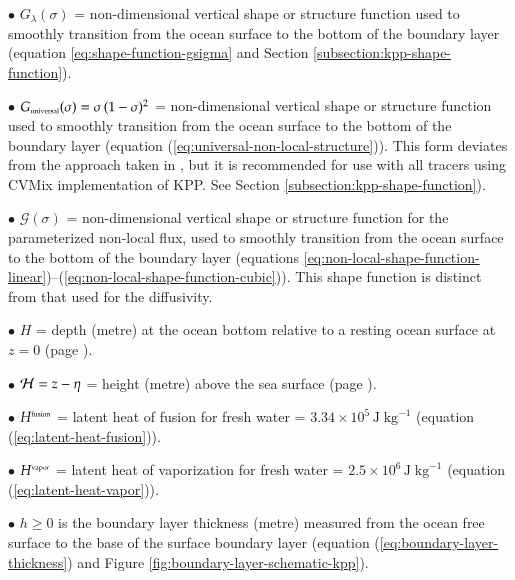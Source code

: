 \begin{trivlist}
 \item[$\bullet$] $G _{\lambda} (\sigma)$ = non-dimensional vertical
   shape or structure function used to smoothly transition from the
   ocean surface to the bottom of the boundary layer (equation
   \ref{eq:shape-function-gsigma} and Section
   \ref{subsection:kpp-shape-function}).

 \item[$\bullet$] $G _{\mbox{\tiny universal}}(\sigma) = \sigma \,
   (1-\sigma)^{2}$ = non-dimensional vertical shape or structure
   function used to smoothly transition from the ocean surface to the
   bottom of the boundary layer (equation
   (\ref{eq:universal-non-local-structure})).  This form deviates from
   the approach taken in \cite{LargeKPP}, but it is recommended for
   use with all tracers using CVMix implementation of KPP. See Section
   \ref{subsection:kpp-shape-function}).

 \item[$\bullet$] $\mathcal{G}(\sigma)$ = non-dimensional vertical
   shape or structure function for the parameterized non-local flux,
   used to smoothly transition from the ocean surface to the bottom of
   the boundary layer (equations
   \ref{eq:non-local-shape-function-linear})--(\ref{eq:non-local-shape-function-cubic})).
   This shape function is distinct from that used for the diffusivity.

\item[$\bullet$] $H$ = depth (metre) at the ocean bottom relative to a
  resting ocean surface at $z=0$ (page
  \pageref{geopotential_defined}).

\item[$\bullet$] ${\cal H} = z - \eta$ = height (metre) above the sea
  surface (page \pageref{height_defined}).

\item[$\bullet$] $H^{\mbox{\tiny fusion}}$ = latent heat of fusion for
  fresh water = $3.34 \times 10^{5} \, \mbox{J} \;\mbox{kg}^{-1}$
  (equation (\ref{eq:latent-heat-fusion})).

\item[$\bullet$] $H^{\mbox{\tiny vapor}}$ = latent heat of
  vaporization for fresh water = $2.5 \times 10^{6} \, \mbox{J} \;
  \mbox{kg}^{-1}$ (equation (\ref{eq:latent-heat-vapor})).

\item[$\bullet$] $h \ge 0$ is the boundary layer thickness (metre) measured from
  the ocean free surface to the base of the surface boundary layer
  (equation (\ref{eq:boundary-layer-thickness}) and Figure
  \ref{fig:boundary-layer-schematic-kpp}).


\end{trivlist}
